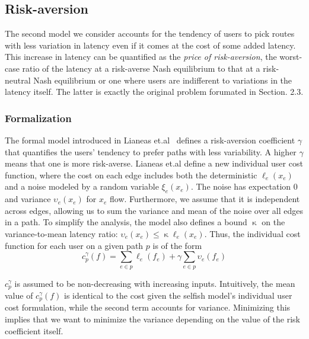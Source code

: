 \subsection{Risk-aversion}
The second model we consider accounts for the tendency of users to pick routes with less variation in latency even if it comes at the cost of some added latency. This increase in latency can be quantified as the {\em{price of risk-aversion}},
the worst-case ratio of the latency at a risk-averse Nash equilibrium to that at a risk-neutral
Nash equilibrium or one where users are indifferent to variations in the latency itself. The latter is exactly the original problem forumated in Section. 2.3.


\subsubsection{Formalization} The formal model introduced in Lianeas et.al~\cite{risk-averse} defines 
a risk-aversion coefficient $\gamma$ that quantifies the users' tendency to prefer paths with less variability. 
A higher $\gamma$ means that one is more risk-averse. Lianeas et.al define a new individual user cost function, where 
the cost on each edge includes both the deterministic $\ell_e(x_e)$ and a noise modeled by a random variable $\xi_e(x_e)$. The noise has expectation $0$ and variance $\upsilon_e(x_e)$ for $x_e$ flow. Furthermore, we assume that it is independent across edges, allowing us to sum the variance and mean of the noise over all edges in a path. To simplify the analysis, the model also defines a bound $\upkappa$ on the variance-to-mean latency ratio:
$\upsilon_e(x_e) \leq \upkappa \ell_e(x_e)$.
Thus, the individual cost function for each user on a given path $p$ is of the form
$$c^\gamma_p(f) = \sum_{e \in p}\ell_e(f_e) + \gamma \sum_{e \in p}\upsilon_e(f_e)$$

$c^\gamma_p$ is assumed to be non-decreasing with increasing inputs. Intuitively, the mean value of $c^\gamma_p(f)$ is identical to the cost given the selfish model's individual user cost formulation, while the second term accounts for variance. Minimizing this implies that we want to minimize the variance depending on the value of the risk coefficient itself.

